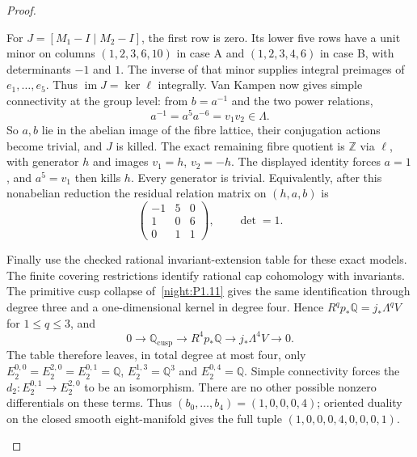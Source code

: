 \begin{proof}
\begin{enumerate}[label={$\langle1\rangle$\arabic*.}]
For $J=[M_1-I\mid M_2-I]$, the first row is zero. Its lower five
rows have a unit minor on columns $(1,2,3,6,10)$ in case A and
$(1,2,3,4,6)$ in case B, with determinants $-1$ and $1$.
The inverse of that minor supplies integral preimages of
$e_1,\ldots,e_5$. Thus
$\operatorname{im}J=\ker\ell$ integrally. Van Kampen now gives
simple connectivity at the group level: from $b=a^{-1}$ and the
two power relations,
\[
 a^{-1}=a^5a^{-6}=v_1v_2\in\Lambda.
\]
So $a,b$ lie in the abelian image of the fibre lattice, their
conjugation actions become trivial, and $J$ is killed. The exact
remaining fibre quotient is $\mathbb Z$ via $\ell$, with generator
$h$ and images $v_1=h$, $v_2=-h$. The displayed identity forces
$a=1$, and $a^5=v_1$ then kills $h$. Every generator is trivial.
Equivalently, after this nonabelian reduction the residual relation
matrix on $(h,a,b)$ is
\[
 \begin{pmatrix}-1&5&0\\1&0&6\\0&1&1\end{pmatrix},
 \qquad\det=1.
\]

Finally use the checked rational invariant-extension table for these
exact models. The finite covering restrictions identify
rational cap cohomology with invariants. The primitive cusp collapse
of~\ref{night:P1.11} gives the same identification through degree
three and a one-dimensional kernel in degree four. Hence
$R^q p_*\mathbb Q=j_*\Lambda^qV$ for $1\le q\le3$, and
\[
 0\longrightarrow\mathbb Q_{\mathrm{cusp}}
 \longrightarrow R^4p_*\mathbb Q
 \longrightarrow j_*\Lambda^4V\longrightarrow0.
\]
The table therefore leaves, in total degree at most four, only
$E_2^{0,0}=E_2^{2,0}=E_2^{0,1}=\mathbb Q$,
$E_2^{1,3}=\mathbb Q^3$ and $E_2^{0,4}=\mathbb Q$.
Simple connectivity forces the $d_2:E_2^{0,1}\to E_2^{2,0}$ to be an isomorphism. There are no
other possible nonzero differentials on these terms. Thus
$(b_0,\ldots,b_4)=(1,0,0,0,4)$; oriented duality on the closed
smooth eight-manifold gives the full tuple
$(1,0,0,0,4,0,0,0,1)$.
\end{enumerate}
\end{proof}




